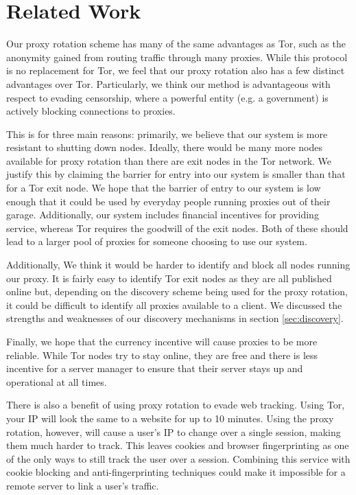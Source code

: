 \section{Related Work}
\label{sec:related}

Our proxy rotation scheme has many of the same advantages as Tor\cite{dingledine2004tor}, such as the anonymity gained from routing traffic through many proxies. While this protocol is no replacement for Tor, we feel that our proxy rotation also has a few distinct advantages over Tor. Particularly, we think our method is advantageous with respect to evading censorship, where a powerful entity (e.g. a government) is actively blocking connections to proxies.

This is for three main reasons: primarily, we believe that our system is more resistant to shutting down nodes. Ideally, there would be many more nodes available for proxy rotation than there are exit nodes in the Tor network. We justify this by claiming the barrier for entry into our system is smaller than that for a Tor exit node. We hope that the barrier of entry to our system is low enough that it could be used by everyday people running proxies out of their garage.  Additionally, our system includes financial incentives for providing service, whereas Tor requires the goodwill of the exit nodes. Both of these should lead to a larger pool of proxies for someone choosing to use our system.

Additionally, We think it would be harder to identify and block all nodes running our proxy. It is fairly easy to identify Tor exit nodes as they are all published online\cite{tor:node} but, depending on the discovery scheme being used for the proxy rotation, it could be difficult to identify all proxies available to a client. We discussed the strengths and weaknesses of our discovery mechanisms in section \ref{sec:discovery}. 

Finally, we hope that the currency incentive will cause proxies to be more reliable. While Tor nodes try to stay online, they are free and there is less incentive for a server manager to ensure that their server stays up and operational at all times.

There is also a benefit of using proxy rotation to evade web tracking. Using Tor, your IP will look the same to a website for up to 10 minutes\cite{tor:faq}. Using the proxy rotation, however, will cause a user's IP to change over a single session, making them much harder to track. This leaves cookies and browser fingerprinting as one of the only ways to still track the user over a session. Combining this service with cookie blocking and anti-fingerprinting techniques could make it impossible for a remote server to link a user's traffic.

